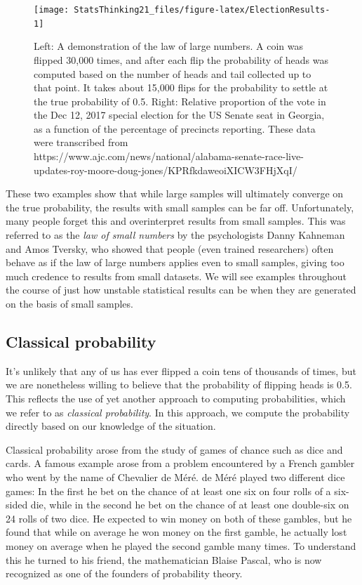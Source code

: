 \documentclass[12pt,]{book}
\theoremstyle{definition}
\theoremstyle{definition}
\theoremstyle{definition}
\theoremstyle{remark}
\begin{document}
\begin{figure}
\texttt{[image: StatsThinking21\_files/figure-latex/ElectionResults-1]} \caption{Left: A demonstration of the law of large numbers.  A coin was flipped 30,000 times, and after each flip the probability of heads was computed based on the number of heads and tail collected up to that point.  It takes about 15,000 flips for the probability to settle at the true probability of 0.5. Right: Relative proportion of the vote in the Dec 12, 2017 special election for the US Senate seat in Georgia, as a function of the percentage of precincts reporting. These data were transcribed from https://www.ajc.com/news/national/alabama-senate-race-live-updates-roy-moore-doug-jones/KPRfkdaweoiXICW3FHjXqI/}\label{fig:ElectionResults}
\end{figure}

These two examples show that while large samples will ultimately converge on the true probability, the results with small samples can be far off. Unfortunately, many people forget this and overinterpret results from small samples. This was referred to as the \emph{law of small numbers} by the psychologists Danny Kahneman and Amos Tversky, who showed that people (even trained researchers) often behave as if the law of large numbers applies even to small samples, giving too much credence to results from small datasets. We will see examples throughout the course of just how unstable statistical results can be when they are generated on the basis of small samples.

\hypertarget{classical-probability}{%
\subsection{Classical probability}\label{classical-probability}}

It's unlikely that any of us has ever flipped a coin tens of thousands of times, but we are nonetheless willing to believe that the probability of flipping heads is 0.5. This reflects the use of yet another approach to computing probabilities, which we refer to as \emph{classical probability}. In this approach, we compute the probability directly based on our knowledge of the situation.

Classical probability arose from the study of games of chance such as dice and cards. A famous example arose from a problem encountered by a French gambler who went by the name of Chevalier de Méré. de Méré played two different dice games: In the first he bet on the chance of at least one six on four rolls of a six-sided die, while in the second he bet on the chance of at least one double-six on 24 rolls of two dice. He expected to win money on both of these gambles, but he found that while on average he won money on the first gamble, he actually lost money on average when he played the second gamble many times. To understand this he turned to his friend, the mathematician Blaise Pascal, who is now recognized as one of the founders of probability theory.
\end{document}
